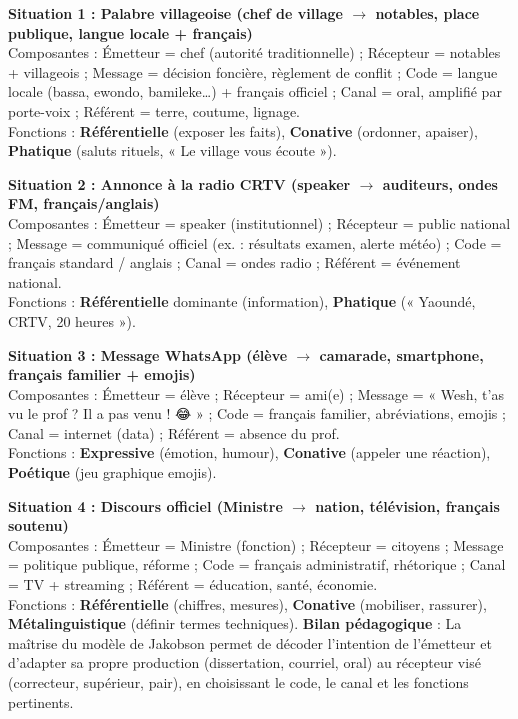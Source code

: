 \documentclass[11pt]{article}
\begin{document}
\begin{exoresolu}
\textbf{Situation 1 : Palabre villageoise (chef de village $\rightarrow$ notables, place publique, langue locale + français)} \\
Composantes : Émetteur = chef (autorité traditionnelle) ; Récepteur = notables + villageois ; Message = décision foncière, règlement de conflit ; Code = langue locale (bassa, ewondo, bamileke…) + français officiel ; Canal = oral, amplifié par porte-voix ; Référent = terre, coutume, lignage. \\
Fonctions : \textbf{Référentielle} (exposer les faits), \textbf{Conative} (ordonner, apaiser), \textbf{Phatique} (saluts rituels, « Le village vous écoute »).

\textbf{Situation 2 : Annonce à la radio CRTV (speaker $\rightarrow$ auditeurs, ondes FM, français/anglais)} \\
Composantes : Émetteur = speaker (institutionnel) ; Récepteur = public national ; Message = communiqué officiel (ex. : résultats examen, alerte météo) ; Code = français standard / anglais ; Canal = ondes radio ; Référent = événement national. \\
Fonctions : \textbf{Référentielle} dominante (information), \textbf{Phatique} (« Yaoundé, CRTV, 20 heures »).

\textbf{Situation 3 : Message WhatsApp (élève $\rightarrow$ camarade, smartphone, français familier + emojis)} \\
Composantes : Émetteur = élève ; Récepteur = ami(e) ; Message = « Wesh, t'as vu le prof ? Il a pas venu ! 😂 » ; Code = français familier, abréviations, emojis ; Canal = internet (data) ; Référent = absence du prof. \\
Fonctions : \textbf{Expressive} (émotion, humour), \textbf{Conative} (appeler une réaction), \textbf{Poétique} (jeu graphique emojis).

\textbf{Situation 4 : Discours officiel (Ministre $\rightarrow$ nation, télévision, français soutenu)} \\
Composantes : Émetteur = Ministre (fonction) ; Récepteur = citoyens ; Message = politique publique, réforme ; Code = français administratif, rhétorique ; Canal = TV + streaming ; Référent = éducation, santé, économie. \\
Fonctions : \textbf{Référentielle} (chiffres, mesures), \textbf{Conative} (mobiliser, rassurer), \textbf{Métalinguistique} (définir termes techniques).
\tcblower
\textbf{Bilan pédagogique} : La maîtrise du modèle de Jakobson permet de décoder l'intention de l'émetteur et d'adapter sa propre production (dissertation, courriel, oral) au récepteur visé (correcteur, supérieur, pair), en choisissant le code, le canal et les fonctions pertinents.
\end{exoresolu}
\end{document}
